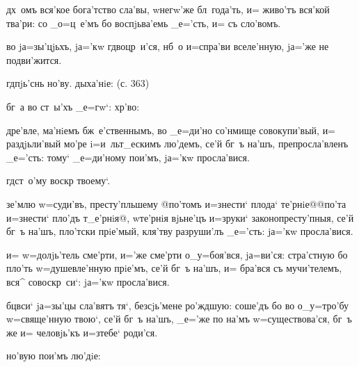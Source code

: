 {{  дх~омъ вся'кое бога'тство сла'вы, 
w\т негw'же бл~года'ть, и= живо'тъ вся'кой тва'ри: со 
_о=ц~е'мъ бо воспjьва'емь _е='сть, и= съ сло'вомъ.


    во jа=зы'цjьхъ, 
jа='кw гд воцр~и'ся, нб~о и=спра'ви вселе'нную, jа='же 
не подви'жится.

  гд пjь'снь но'ву. 
 дыха'нiе: (с. 363)

  бг~а во ст~ы'хъ _е=гw`: 
       
хр'во: 



  дре'вле, ма'нiемъ бж~е'ственнымъ, 
во _е=ди'но со'нмище совокупи'вый, и= раздjьли'вый мо'ре 
i=и~льт_ескимъ лю'демъ, се'й бг~ъ на'шъ, препросла'вленъ 
_е='сть: тому` _е=ди'ному пои'мъ, jа='кw просла'вися.

  гд ст~о'му воскр 
твоему`.

 зе'млю w=суди'въ, престу'пльшему @по'томъ 
и=знести` плода` те'рнiе@{@по'та и=знести` пло'дъ 
т_е'рнiя@}, w\т те'рнiя вjьне'цъ и=з\ъ руки` 
законопресту'пныя, се'й бг~ъ на'шъ, пло'тски прiе'мый, 
кля'тву разруши'лъ _е='сть: jа='кw просла'вися.

 и= w=долjь'тель сме'рти, и='же 
сме'рти о_у=боя'вся, jа=ви'ся: стра'стную бо пло'ть 
w=душевле'нную прiе'мъ, се'й бг~ъ на'шъ, и= бра'вся съ 
мучи'телемъ, вся^ совоскр~си`: jа='кw просла'вися.

  бц вси` jа=зы'цы 
сла'вятъ тя`, без\ъ сjь'мене ро'ждшую: соше'дъ бо во 
о_у=тро'бу w=свяще'нную твою`, се'й бг~ъ на'шъ, _е='же по 
на'мъ w=существова'ся, бг~ъ же и= человjь'къ и=з\ъ тебе` 
роди'ся.



  но'вую пои'мъ лю'дiе:

}}
